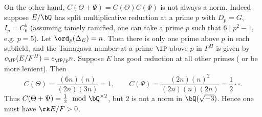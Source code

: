 \begin{example}
    On the other hand, $C(\Theta + \Psi) = C(\Theta)C(\Psi)$ is not always a norm. Indeed suppose $E / \bQ$ has split multiplicative reduction at a prime $p$ with $D_p = G$, $I_p = C_6^b$ (assuming tamely ramified, one can take a prime $p$ such that $6 \mid p^2 - 1$, e.g. $p = 5$). Let $\ord_p(\Delta_E) = n$. Then there is only one prime above $p$ in each subfield, and the Tamagawa number at a prime $\fP$ above $p$ in $F^H$ is given by $c_{\fP}(E / F^H) = e_{\fP / p} n$. Suppose $E$ has good reduction at all other primes ({\color{red} or be more lenient}).
     Then 
        $$C(\Theta) = \frac{(6n)(n)}{(2n) (3n)} = 1, \qquad
            C(\Psi) = \frac{(2n)(n)^2}{(2n)(n)(2n)} = \frac{1}{2} \cdot \square.$$
    Thus $C(\Theta + \Psi) = \frac{1}{2} \mod \bQ^{\times 2}$, but $2$ is not a norm in $\bQ(\sqrt{-3})$. Hence one must have $\rk E / F > 0$. 
\end{example}

